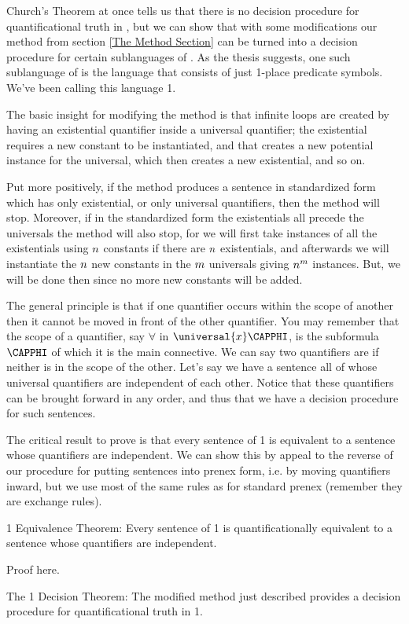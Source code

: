 Church's Theorem at once tells us that there is no decision procedure for quantificational truth in \GQL{}, but we can show that with some modifications our method from section \ref{The Method Section} can be turned into a decision procedure for certain sublanguages of \GQL{}. 
As the thesis suggests, one such sublanguage  of \GQL{} is the language that consists of just 1-place predicate symbols. 
We've been calling this language \GQL{}1.

The basic insight for modifying the method is that infinite loops are created by having an existential quantifier inside a universal quantifier; 
the existential requires a new constant to be instantiated, and that creates a new potential instance for the universal, which then creates a new existential, and so on. 

Put more positively, if the method produces a sentence in standardized form which has only existential, or only universal quantifiers, then the method will stop. 
Moreover, if in the standardized form the existentials all precede the universals the method will also stop, for we will first take instances of all the existentials using $n$ constants if there are $n$ existentials, and afterwards we will instantiate the $n$ new constants in the $m$ universals giving $n^m$ instances.
But, we will be done then since no more new constants will be added. 

The general principle is that if one quantifier occurs within the scope of another then it cannot be moved in front of the other quantifier. 
You may remember that the scope of a quantifier, say $\forall$ in $\universal{\variable{x}}\CAPPHI$, is the subformula $\CAPPHI$ of which it is the main connective. 
We can say two quantifiers are  if neither is in the scope of the other.
Let's say we have a sentence all of whose universal quantifiers are independent of each other.
Notice that these quantifiers can be brought forward in any order, and thus that we have a decision procedure for such sentences. 

The critical result to prove is that every sentence of \GQL{}1 is equivalent to a sentence whose quantifiers are independent. 
We can show this by appeal to the reverse of our procedure for putting sentences into prenex form, i.e. by moving quantifiers inward, but we use most of the same rules as for standard prenex (remember they are exchange rules).
\begin{THEOREM}{  \GQL{}1 Equivalence Theorem:}
Every sentence of \GQL{}1 is quantificationally equivalent to a sentence whose quantifiers are independent.
\end{THEOREM}
\begin{PROOF}
Proof here.
\end{PROOF}
\begin{THEOREM}{ The \GQL{}1 Decision Theorem:}
The modified method just described provides a decision procedure for quantificational truth in \GQL{}1.
\end{THEOREM}

